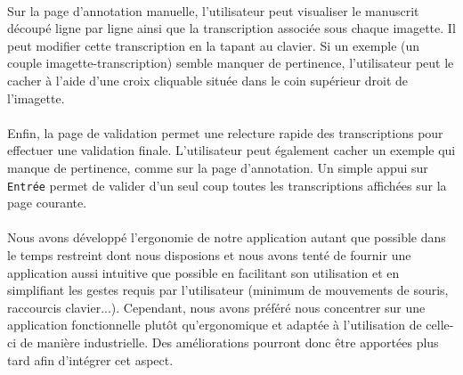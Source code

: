 \paragraph{}
Sur la page d'annotation manuelle, l'utilisateur peut visualiser le manuscrit découpé ligne par ligne ainsi que la transcription associée sous chaque imagette. Il peut modifier cette transcription en la tapant au clavier. Si un exemple (un couple imagette-transcription) semble manquer de pertinence, l'utilisateur peut le cacher à l'aide d'une croix cliquable située dans le coin supérieur droit de l'imagette.
\paragraph{}
Enfin, la page de validation permet une relecture rapide des transcriptions pour effectuer une validation finale. L'utilisateur peut également cacher un exemple qui manque de pertinence, comme sur la page d'annotation. Un simple appui sur \texttt{Entrée} permet de valider d'un seul coup toutes les transcriptions affichées sur la page courante.

\paragraph{}
Nous avons développé l'ergonomie de notre application autant que possible dans le temps restreint dont nous disposions et nous avons tenté de fournir une application aussi intuitive que possible en facilitant son utilisation et en simplifiant les gestes requis par l'utilisateur (minimum de mouvements de souris, raccourcis clavier...). Cependant, nous avons préféré nous concentrer sur une application fonctionnelle plutôt qu'ergonomique et adaptée à l'utilisation de celle-ci de manière industrielle. Des améliorations pourront donc être apportées plus tard afin d'intégrer cet aspect.
